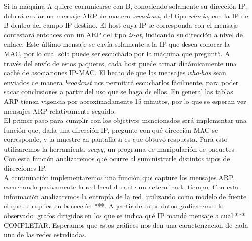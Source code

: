 Si la m\'aquina A quiere comunicarse con B, conociendo solamente su direcci\'on IP, deber\'a enviar un mensaje ARP de manera \emph{broadcast}, del tipo \emph{who-is}, con la IP de B dentro del campo IP-destino. El host cuya IP se corresponda con el mensaje contestar\'a entonces con un ARP del tipo \emph{is-at}, indicando su direcci\'on a nivel de enlace. Este \'ultimo mensaje se env\'ia solamente a la IP que desea conocer la MAC, por lo cual s\'olo puede ser escuchado por la m\'aquina que pregunt\'o. A trav\'es del env\'io de estos paquetes, cada host puede armar din\'amicamente una cach\'e de asociaciones IP-MAC. El hecho de que los mensajes \emph{who-has} sean enviados de manera \emph{broadcast} nos permitir\'a escucharlos f\'acilmente, para poder sacar conclusiones a partir del uso que se haga de ellos. En general las tablas ARP tienen vigencia por aproximadamente 15 minutos, por lo que se esperan ver mensajes ARP relativamente seguido.\\

El primer paso para cumplir con los objetivos mencionados ser\'a implementar una funci\'on que, dada una direcci\'on IP, pregunte con qu\'e direcci\'on MAC se corresponde, y la muestre en pantalla si es que obtuvo respuesta. Para esto utilizaremos la herramienta \emph{scapy}, un programa de manipulaci\'on de paquetes. Con esta funci\'on analizaremos qu\'e ocurre al suministrarle distintos tipos de direcciones IP.\\

A continuaci\'on implementaremos una funci\'on que capture los mensajes ARP, escuchando pasivamente la red local durante un determinado tiempo. Con esta informaci\'on analizaremos la entrop\'ia de la red, utilizando como modelo de fuente el que se explica en la secci\'on ***. A partir de estos datos graficaremos lo observado: grafos dirigidos en los que se indica qu\'e IP mand\'o mensaje a cual *** COMPLETAR. Esperamos que estos gr\'aficos nos den una caracterizaci\'on de cada una de las redes estudiadas.


